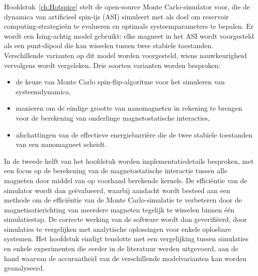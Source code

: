 Hoofdstuk~\ref{ch:Hotspice} stelt de open-source \hotspice Monte Carlo-simulator voor, die de dynamica van artificieel spin-ijs (ASI) simuleert met als doel om reservoir computing-strategie\"en te evalueren en optimale systeemparameters te bepalen.
Er wordt een Ising-achtig model gebruikt: elke magneet in het ASI wordt voorgesteld als een punt-dipool die kan wisselen tussen twee stabiele toestanden.
Verschillende varianten op dit model worden voorgesteld, wiens nauwkeurigheid vervolgens wordt vergeleken.%
Drie soorten varianten worden besproken:
\begin{itemize}[noitemsep,nolistsep] %
	\item de keuze van Monte Carlo spin-flip-algoritme voor het simuleren van systeemdynamica,
	\item manieren om de eindige grootte van nanomagneten in rekening te brengen voor de berekening van onderlinge magnetostatische interacties,
	\item afschattingen van de effectieve energiebarri\`ere die de twee stabiele toestanden van een nanomagneet scheidt.
\end{itemize}
In de tweede helft van het hoofdstuk worden implementatiedetails besproken, met een focus op de berekening van de magnetostatische interactie tussen alle magneten door middel van op voorhand berekende kernels.
De effici\"entie van de simulator wordt dan ge\"evalueerd, waarbij aandacht wordt besteed aan een methode om de effici\"entie van de Monte Carlo-simulatie te verbeteren door de magnetisatierichting van meerdere magneten tegelijk te wisselen binnen \'e\'en simulatiestap.
De correcte werking van de software wordt dan geverifi\"eerd, door simulaties te vergelijken met analytische oplossingen voor enkele oplosbare systemen.
Het hoofdstuk eindigt tenslotte met een vergelijking tussen simulaties en enkele experimenten die eerder in de literatuur werden uitgevoerd, aan de hand waarvan de accuraatheid van de verschillende modelvarianten kan worden geanalyseerd. \\

